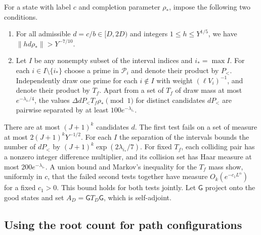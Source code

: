 \documentclass[11pt]{amsart}
\numberwithin{equation}{section}
\theoremstyle{remark}
\begin{document}
For a state with label $c$ and completion parameter $\rho_*$, impose
the following two conditions.
\begin{enumerate}
\item For all admissible $d=c/b\in[D,2D)$ and integers
 $1\le h\le Y^{1/5}$, we have $\|hd\rho_*\|>Y^{-7/10}$.
\item Let $I$ be any nonempty subset of the interval indices and
 $i_*=\max I$. For each $i\in I\setminus\{i_*\}$ choose a prime in
 $\mathcal P_i$ and denote their product by $P_<$. Independently
 draw one prime for each $i\notin I$ with weight $(\ell V_i)^{-1}$,
 and denote their product by $T_f$. Apart from a set of $T_f$ of
 draw mass at most $e^{-\lambda_{i_*}/4}$, the values
 $\Delta dP_<T_f\rho_*\pmod1$ for distinct candidates $dP_<$ are
 pairwise separated by at least $100e^{-\lambda_{i_*}}$.
\end{enumerate}
There are at most $(J+1)^k$ candidates $d$. The first test fails on a
set of measure at most $2(J+1)^kY^{-1/2}$. For each $I$ the separation
of the intervals bounds the number of $dP_<$ by
$(J+1)^k\exp(2\lambda_{i_*}/7)$. For fixed $T_f$, each colliding pair
has a nonzero integer difference multiplier, and its collision set
has Haar measure at most $200e^{-\lambda_{i_*}}$. A union bound and
Markov's inequality for the $T_f$ mass show, uniformly in $c$, that the
failed second tests together have measure $O_k(e^{-c_1L^\alpha})$
for a fixed $c_1>0$. This bound holds for both tests jointly.
Let $\mathsf G$ project onto the good states and set
$A_D=\mathsf G T_D\mathsf G$, which is self-adjoint.

\subsection{Using the root count for path configurations}
\end{document}
